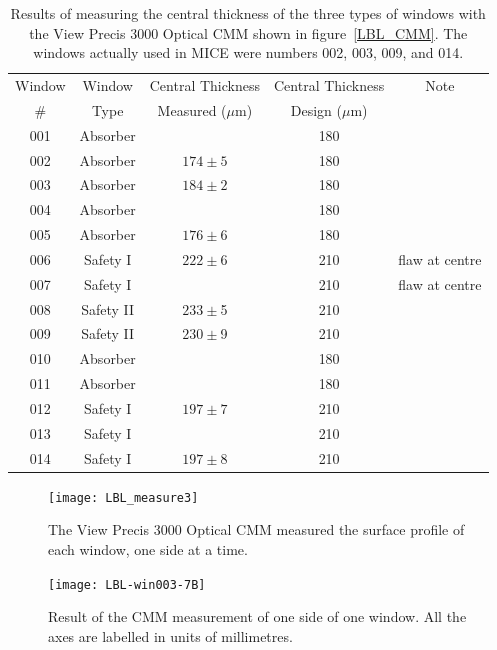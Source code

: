 \begin{table}
  \caption{
    Results of measuring the central thickness of the three types of
    windows with the View Precis 3000 Optical CMM shown in
    figure~\ref{LBL_CMM}.
    The windows actually used in MICE were numbers 002, 003, 009, and
    014.
  }
  \label{tab:summary}
  \begin{center}
    \begin{tabular}{|c c c  c c|}
    \hline
Window & Window & Central Thickness & Central Thickness & Note    \rule{0pt}{14pt} \\
 \#  &    Type      & Measured ($\mu$m)              & Design ($\mu$m) &  \\
\hline
001 & Absorber& & 180 & \\
002 & Absorber& $174\pm5$ &180&\\
003 & Absorber& $184\pm2$ & 180&\\
004 & Absorber&& 180&\\
005 & Absorber& $176\pm6$ & 180 &\\
006 & Safety I& $222\pm6$ &210 & flaw at centre\\
007 & Safety I& & 210&  flaw at centre\\
008 & Safety II& $233\pm$5 &210 &\\
009 & Safety II& $230\pm$9 &210 &\\
010 & Absorber&  & 180&\\
011 & Absorber&  & 180&\\
012 & Safety I& $197\pm 7$ & 210  & \\
013& Safety I & & 210  &\\
014 & Safety I & $197\pm8$ & 210 &\\
    \hline
    \end{tabular}
  \end{center}
\end{table}
\begin{figure}
  \begin{minipage}{0.46\textwidth}
    \centerline{\texttt{[image: LBL\_measure3]}}
    \caption{
      The View Precis 3000 Optical CMM measured the surface profile of
      each window, one side at a time.
    }
    \label{LBL_CMM}
  \end{minipage}\hfill%
  \begin{minipage}{0.46\textwidth}
    \centerline{\texttt{[image: LBL-win003-7B]}}
    \caption{
      Result of the CMM measurement of one side of one window. All the axes are
      labelled in units of millimetres.
    }
    \label{LBL_CMM2}
  \end{minipage}
\end{figure}

